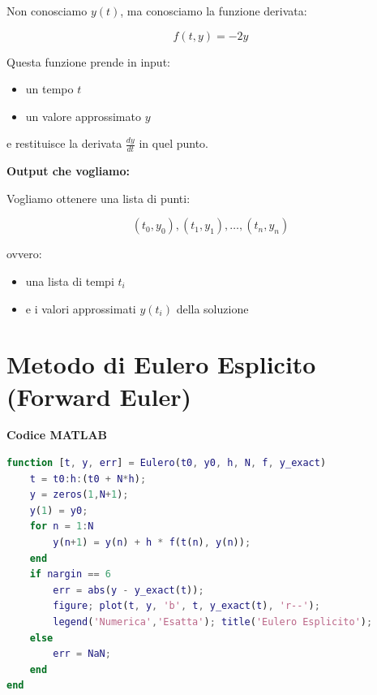 \documentclass[12pt,a4paper]{article}
\begin{document}
\begin{flushleft}
Non conosciamo \( y(t) \), ma conosciamo la funzione derivata:

\[
f(t,y) = -2y
\]

Questa funzione prende in input:
\begin{itemize}
    \item un tempo \( t \)
    \item un valore approssimato \( y \)
\end{itemize}
e restituisce la derivata \( \frac{dy}{dt} \) in quel punto.

\vspace{0.5em}
\textbf{Output che vogliamo:}

Vogliamo ottenere una lista di punti:

\[
(t_0, y_0), (t_1, y_1), \dots, (t_n, y_n)
\]

ovvero:
\begin{itemize}
    \item una lista di tempi \( t_i \)
    \item e i valori approssimati \( y(t_i) \) della soluzione
\end{itemize}

\section*{Metodo di Eulero Esplicito (Forward Euler)}


\vspace{1em}
\textbf{Codice MATLAB}
\begin{lstlisting}[language=Matlab]
function [t, y, err] = Eulero(t0, y0, h, N, f, y_exact)
    t = t0:h:(t0 + N*h);
    y = zeros(1,N+1);
    y(1) = y0;
    for n = 1:N
        y(n+1) = y(n) + h * f(t(n), y(n));
    end
    if nargin == 6
        err = abs(y - y_exact(t));
        figure; plot(t, y, 'b', t, y_exact(t), 'r--');
        legend('Numerica','Esatta'); title('Eulero Esplicito');
    else
        err = NaN;
    end
end
\end{lstlisting}


\end{flushleft}
\end{document}

